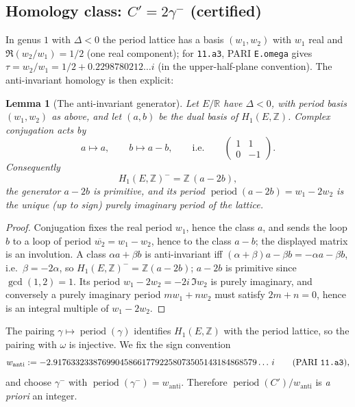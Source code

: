 \documentclass[preprint,12pt]{elsarticle}
\newtheorem{lemma}[theorem]{Lemma}
\theoremstyle{definition}
\theoremstyle{remark}
\newcommand{\Z}{\mathbb{Z}}
\newcommand{\R}{\mathbb{R}}
\DeclareMathOperator{\period}{period}
\begin{document}
\subsection{Homology class: \texorpdfstring{$C'=2\gamma^-$}{C'=2g-} (certified)}
\label{subsec:class}

In genus $1$ with $\Delta<0$ the period lattice has a basis $(w_1,w_2)$
with $w_1$ real and $\Re(w_2/w_1)=1/2$ (one real component); for
\texttt{11.a3}, PARI \texttt{E.omega} gives $\tau=w_2/w_1=1/2+0.2298780212\ldots i$
(in the upper-half-plane convention). The anti-invariant homology is then
explicit:

\begin{lemma}[The anti-invariant generator]\label{lem:antiinv}
Let $E/\R$ have $\Delta<0$, with period basis $(w_1,w_2)$ as above, and let
$(a,b)$ be the dual basis of $H_1(E,\Z)$. Complex conjugation acts by
\[
  a\mapsto a,\qquad b\mapsto a-b,
  \qquad\text{i.e.}\qquad
  \begin{pmatrix}1&1\\0&-1\end{pmatrix}.
\]
Consequently
\[
  H_1(E,\Z)^-=\Z\,(a-2b),
\]
the generator $a-2b$ is primitive, and its period
$\period(a-2b)=w_1-2w_2$ is the unique (up to sign) purely imaginary period
of the lattice.
\end{lemma}

\begin{proof}
Conjugation fixes the real period $w_1$, hence the class $a$, and sends the
loop $b$ to a loop of period $\overline{w_2}=w_1-w_2$, hence to the class
$a-b$; the displayed matrix is an involution. A class $\alpha a+\beta b$ is
anti-invariant iff $(\alpha+\beta)a-\beta b=-\alpha a-\beta b$, i.e.\
$\beta=-2\alpha$, so $H_1(E,\Z)^-=\Z(a-2b)$; $a-2b$ is primitive since
$\gcd(1,2)=1$. Its period $w_1-2w_2=-2i\,\Im w_2$ is purely imaginary, and
conversely a purely imaginary period $mw_1+nw_2$ must satisfy $2m+n=0$,
hence is an integral multiple of $w_1-2w_2$.
\end{proof}

The pairing $\gamma\mapsto\period(\gamma)$ identifies $H_1(E,\Z)$ with the
period lattice, so the pairing with $\omega$ is injective. We fix the sign
convention
{\footnotesize
\[
  w_{\mathrm{anti}}:=-2.9176332338769904586617792258073505143184868579\ldots\,i
  \qquad(\text{PARI \texttt{11.a3}}),
\]}
and choose $\gamma^-$ with $\period(\gamma^-)=w_{\mathrm{anti}}$. Therefore
$\period(C')/w_{\mathrm{anti}}$ is \emph{a priori} an integer.
\end{document}
